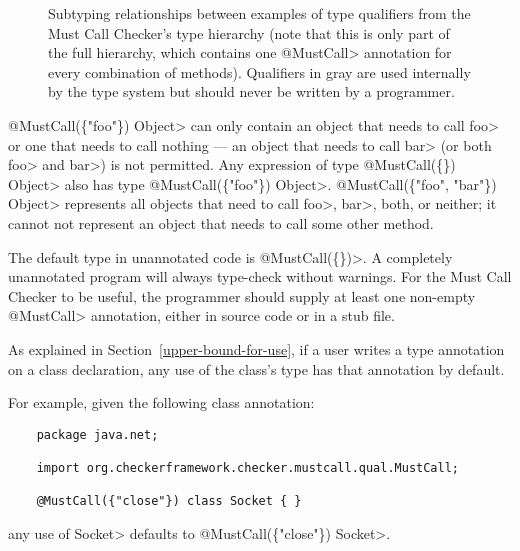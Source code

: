 \begin{figure}
\caption{Subtyping relationships between examples of type qualifiers from the Must Call Checker's type
hierarchy (note that this is only part of the full hierarchy, which contains one \<@MustCall> annotation
for every combination of methods).
Qualifiers in gray are used internally by the type system but should
never be written by a programmer.}
\label{fig-must-call-hierarchy}
\end{figure}

\<@MustCall(\{"foo"\}) Object> can only
contain an object that needs to call \<foo> or one that needs to call nothing --- an
object that needs to call \<bar> (or both \<foo> and \<bar>) is not permitted.
Any expression of type \<@MustCall(\{\}) Object> also has type
\<@MustCall(\{"foo"\}) Object>.
\<@MustCall(\{"foo", "bar"\}) Object> represents all objects that need to
call \<foo>, \<bar>, both, or neither; it cannot not represent an object that needs
to call some other method.

The default type in unannotated code is \<@MustCall(\{\})>.
A completely unannotated program will always type-check without warnings.
For the Must Call Checker to be useful, the programmer should supply at least one non-empty
\<@MustCall> annotation, either in source code or in a stub file.


As explained in Section~\ref{upper-bound-for-use}, if a user writes a type
annotation on a class declaration, any use of the class's type has that
annotation by default.

For example, given the following class annotation:
\begin{Verbatim}
    package java.net;

    import org.checkerframework.checker.mustcall.qual.MustCall;

    @MustCall({"close"}) class Socket { }
\end{Verbatim}
any use of \<Socket> defaults to \<@MustCall(\{"close"\}) Socket>.



